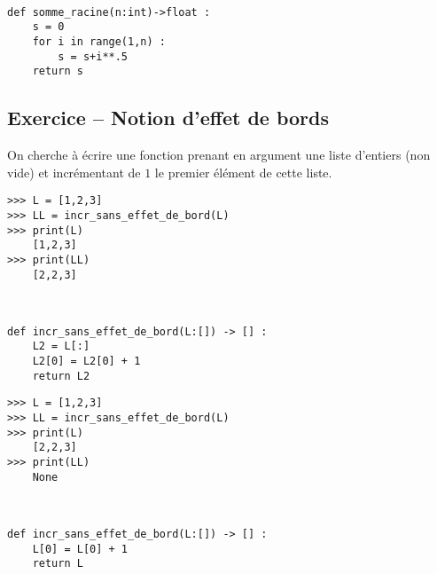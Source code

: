 \ifprof
\begin{corrige}~\\ \vspace{-.5cm}
\begin{lstlisting}
def somme_racine(n:int)->float :
    s = 0
    for i in range(1,n) :
        s = s+i**.5
    return s
\end{lstlisting}
\end{corrige}
\else
\fi

\subsection*{Exercice -- Notion d'effet de bords}

On cherche à écrire une fonction prenant en argument une liste d'entiers (non vide) et incrémentant de $1$ le premier élément de cette liste.


\begin{lstlisting}
>>> L = [1,2,3]
>>> LL = incr_sans_effet_de_bord(L)
>>> print(L)
    [1,2,3]
>>> print(LL)
    [2,2,3]
\end{lstlisting}


\ifprof
\begin{corrige}~\\ \vspace{-.5cm}
\begin{lstlisting}
def incr_sans_effet_de_bord(L:[]) -> [] :
    L2 = L[:]
    L2[0] = L2[0] + 1
    return L2
\end{lstlisting}
\end{corrige}
\else
\fi


\begin{lstlisting}
>>> L = [1,2,3]
>>> LL = incr_sans_effet_de_bord(L)
>>> print(L)
    [2,2,3]
>>> print(LL)
    None
\end{lstlisting}
\ifprof
\begin{corrige}~\\ \vspace{-.5cm}
\begin{lstlisting}
def incr_sans_effet_de_bord(L:[]) -> [] :
    L[0] = L[0] + 1 
    return L
\end{lstlisting}
\end{corrige}
\else
\fi


